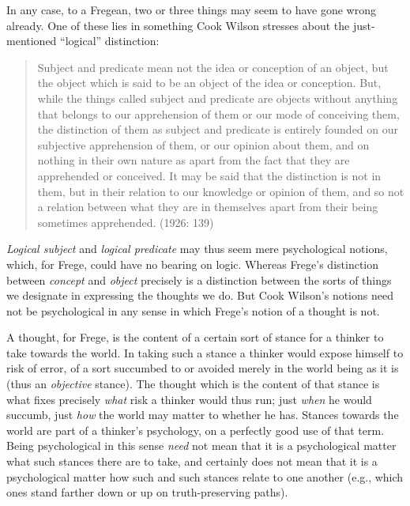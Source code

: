 In any case, to a Fregean, two or three things may seem to have gone wrong already. One of these lies in something Cook Wilson stresses about the just-mentioned ``logical'' distinction:
\begin{quote}
	Subject and predicate mean not the idea or conception of an object, but the object which is said to be an object of the idea or conception. But, while the things called subject and predicate are objects without anything that belongs to our apprehension of them or our mode of conceiving them, the distinction of them as subject and predicate is entirely founded on our subjective apprehension of them, or our opinion about them, and on nothing in their own nature as apart from the fact that they are apprehended or conceived. It may be said that the distinction is not in them, but in their relation to our knowledge or opinion of them, and so not a relation between what they are in themselves apart from their being sometimes apprehended. (1926: 139)
\end{quote}
\emph{Logical subject} and \emph{logical predicate} may thus seem mere psychological notions, which, for Frege, could have no bearing on logic. Whereas Frege's distinction between \emph{concept} and \emph{object} precisely is a distinction between the sorts of things we designate in expressing the thoughts we do. But Cook Wilson's notions need not be psychological in any sense in which Frege's notion of a thought is not.

A thought, for Frege, is the content of a certain sort of stance for a thinker to take towards the world. In taking such a stance a thinker would expose himself to risk of error, of a sort succumbed to or avoided merely in the world being as it is (thus an \emph{objective} stance). The thought which is the content of that stance is what fixes precisely \emph{what} risk a thinker would thus run; just \emph{when} he would succumb, just \emph{how} the world may matter to whether he has. Stances towards the world are part of a thinker's psychology, on a perfectly good use of that term. Being psychological in this sense \emph{need} not mean that it is a psychological matter what such stances there are to take, and certainly does not mean that it is a psychological matter how such and such stances relate to one another (e.g., which ones stand farther down or up on truth-preserving paths).


